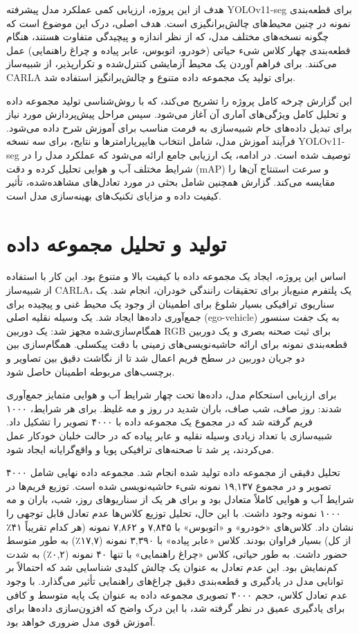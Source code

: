 \documentclass[oneside]{report}
\begin{document}
هدف از این پروژه، ارزیابی کمی عملکرد مدل پیشرفته YOLOv11-seg برای قطعه‌بندی نمونه در چنین محیط‌های چالش‌برانگیزی است. هدف اصلی، درک این موضوع است که چگونه نسخه‌های مختلف مدل، که از نظر اندازه و پیچیدگی متفاوت هستند، هنگام قطعه‌بندی چهار کلاس شیء حیاتی (خودرو، اتوبوس، عابر پیاده و چراغ راهنمایی) عمل می‌کنند. برای فراهم آوردن یک محیط آزمایشی کنترل‌شده و تکرارپذیر، از شبیه‌ساز CARLA برای تولید یک مجموعه داده متنوع و چالش‌برانگیز استفاده شد.

این گزارش چرخه کامل پروژه را تشریح می‌کند، که با روش‌شناسی تولید مجموعه داده و تحلیل کامل ویژگی‌های آماری آن آغاز می‌شود. سپس مراحل پیش‌پردازش مورد نیاز برای تبدیل داده‌های خام شبیه‌سازی به فرمت مناسب برای آموزش شرح داده می‌شود. فرآیند آموزش مدل، شامل انتخاب هایپرپارامترها و نتایج، برای سه نسخه YOLOv11-seg توصیف شده است. در ادامه، یک ارزیابی جامع ارائه می‌شود که عملکرد مدل را در شرایط مختلف آب و هوایی تحلیل کرده و دقت (mAP) و سرعت استنتاج آن‌ها را مقایسه می‌کند. گزارش همچنین شامل بحثی در مورد تعادل‌های مشاهده‌شده، تأثیر کیفیت داده و مزایای تکنیک‌های بهینه‌سازی مدل است.

\chapter{تولید و تحلیل مجموعه داده}
اساس این پروژه، ایجاد یک مجموعه داده با کیفیت بالا و متنوع بود. این کار با استفاده از شبیه‌ساز CARLA، یک پلتفرم منبع‌باز برای تحقیقات رانندگی خودران، انجام شد. یک سناریوی ترافیکی بسیار شلوغ برای اطمینان از وجود یک محیط غنی و پیچیده برای جمع‌آوری داده‌ها ایجاد شد. یک وسیله نقلیه اصلی (ego-vehicle) به یک جفت سنسور همگام‌سازی‌شده مجهز شد: یک دوربین RGB برای ثبت صحنه بصری و یک دوربین قطعه‌بندی نمونه برای ارائه حاشیه‌نویسی‌های زمینی  با دقت پیکسلی. همگام‌سازی بین دو جریان دوربین در سطح فریم اعمال شد تا از نگاشت دقیق بین تصاویر و برچسب‌های مربوطه اطمینان حاصل شود.

برای ارزیابی استحکام مدل، داده‌ها تحت چهار شرایط آب و هوایی متمایز جمع‌آوری شدند: روز صاف، شب صاف، باران شدید در روز و مه غلیظ. برای هر شرایط، ۱۰۰۰ فریم گرفته شد که در مجموع یک مجموعه داده با ۴۰۰۰ تصویر را تشکیل داد. شبیه‌سازی با تعداد زیادی وسیله نقلیه و عابر پیاده که در حالت خلبان خودکار عمل می‌کردند، پر شد تا صحنه‌های ترافیکی پویا و واقع‌گرایانه ایجاد شود.

تحلیل دقیقی از مجموعه داده تولید شده انجام شد. مجموعه داده نهایی شامل ۴۰۰۰ تصویر و در مجموع ۱۹,۱۳۷ نمونه شیء حاشیه‌نویسی شده است. توزیع فریم‌ها در شرایط آب و هوایی کاملاً متعادل بود و برای هر یک از سناریوهای روز، شب، باران و مه ۱۰۰۰ نمونه وجود داشت. با این حال، تحلیل توزیع کلاس‌ها عدم تعادل قابل توجهی را نشان داد. کلاس‌های «خودرو» و «اتوبوس» با ۷,۸۴۵ و ۷,۸۶۲ نمونه (هر کدام تقریباً ۴۱٪ از کل) بسیار فراوان بودند. کلاس «عابر پیاده» با ۳,۳۹۰ نمونه (۱۷,۷٪) به طور متوسط حضور داشت. به طور حیاتی، کلاس «چراغ راهنمایی» با تنها ۴۰ نمونه (۰,۲٪) به شدت کم‌نمایش بود. این عدم تعادل به عنوان یک چالش کلیدی شناسایی شد که احتمالاً بر توانایی مدل در یادگیری و قطعه‌بندی دقیق چراغ‌های راهنمایی تأثیر می‌گذارد. با وجود عدم تعادل کلاس، حجم ۴۰۰۰ تصویری مجموعه داده به عنوان یک پایه متوسط و کافی برای یادگیری عمیق در نظر گرفته شد، با این درک واضح که افزون‌سازی داده‌ها برای آموزش قوی مدل ضروری خواهد بود.
\end{document}

